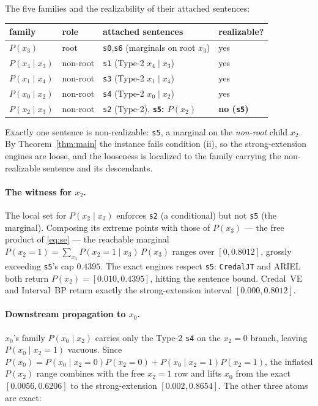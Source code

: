 \documentclass[11pt]{article}
\begin{document}
The five families and the
realizability of their attached sentences:
\begin{center}\small
\begin{tabular}{llll}
\toprule
family & role & attached sentences & realizable? \\
\midrule
$P(x_3)$        & root      & \texttt{s0},\texttt{s6} (marginals on root $x_3$) & yes \\
$P(x_4\mid x_3)$ & non-root & \texttt{s1} (Type-2 $x_4\mid x_3$) & yes \\
$P(x_1\mid x_4)$ & non-root & \texttt{s3} (Type-2 $x_1\mid x_4$) & yes \\
$P(x_0\mid x_2)$ & non-root & \texttt{s4} (Type-2 $x_0\mid x_2$) & yes \\
$P(x_2\mid x_3)$ & non-root & \texttt{s2} (Type-2), \;\textbf{\texttt{s5}: $P(x_2)$} & \textbf{no (\texttt{s5})} \\
\bottomrule
\end{tabular}
\end{center}
Exactly one sentence is non-realizable: \texttt{s5}, a marginal on the \emph{non-root} child $x_2$.
By Theorem~\ref{thm:main} the instance fails condition (ii), so the strong-extension engines are
loose, and the looseness is localized to the family carrying the non-realizable sentence and its
descendants.

\paragraph{The witness for $x_2$.} The local set for $P(x_2\mid x_3)$ enforces \texttt{s2} (a
conditional) but not \texttt{s5} (the marginal). Composing its extreme points with those of $P(x_3)$
--- the free product of \eqref{eq:se} --- the reachable marginal
$P(x_2{=}1)=\sum_{x_3}P(x_2{=}1\mid x_3)\,P(x_3)$ ranges over $[0,0.8012]$, grossly exceeding
\texttt{s5}'s cap $0.4395$. The exact engines respect \texttt{s5}: \texttt{CredalJT} and ARIEL both
return $P(x_2)=[0.010,0.4395]$, hitting the sentence bound. Credal~VE and Interval~BP return exactly
the strong-extension interval $[0.000,0.8012]$.

\paragraph{Downstream propagation to $x_0$.} $x_0$'s family $P(x_0\mid x_2)$ carries only the Type-2
\texttt{s4} on the $x_2{=}0$ branch, leaving $P(x_0\mid x_2{=}1)$ vacuous. Since
$P(x_0)=P(x_0\mid x_2{=}0)P(x_2{=}0)+P(x_0\mid x_2{=}1)P(x_2{=}1)$, the inflated $P(x_2)$ range
combines with the free $x_2{=}1$ row and lifts $x_0$ from the exact $[0.0056,0.6206]$ to the
strong-extension $[0.002,0.8654]$. The other three atoms are exact:
\end{document}
